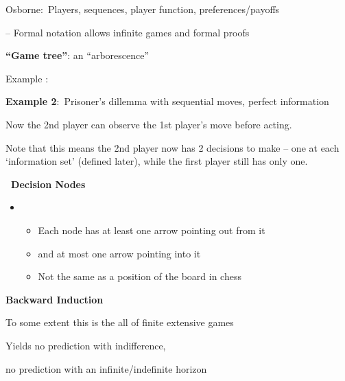 Osborne:\ Players, sequences, player function, preferences/payoffs

-- Formal notation allows infinite games and formal proofs

\textbf{\textquotedblleft Game tree\textquotedblright }: an
\textquotedblleft arborescence\textquotedblright

Example :



 \textbf{Example 2}:\ Prisoner's dillemma with sequential moves, perfect
information 

Now the 2nd player can observe the 1st player's move before acting. \

Note that this means the 2nd player now has 2 decisions to make -- one at
each `information set' (defined later), while the first player still has
only one.


\textbf{\ Decision Nodes}

\begin{itemize}
\item
\begin{itemize}
\item Each node has at least one arrow pointing out from it

\item and at most one arrow pointing into it

\item Not the same as a position of the board in chess
\end{itemize}
\end{itemize}


\textbf{Backward Induction}

To some extent this is the all of finite extensive games

Yields no prediction with indifference,

no prediction with an infinite/indefinite horizon

